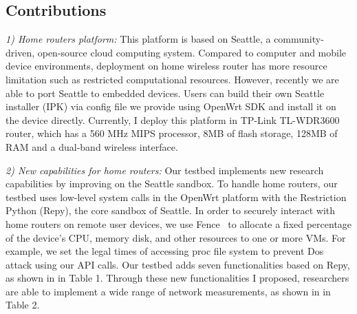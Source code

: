 \documentclass[conference]{IEEEtran}   	%
\begin{document}
\subsection{Contributions}
\textit{1) Home routers platform:} This platform is based on Seattle\cite{zhuang2013experience}, a community-driven, open-source cloud computing system. Compared to computer and mobile device environments, deployment on home wireless router has more resource limitation such as restricted computational resources. However, recently we are able to port Seattle to embedded devices. Users can build their own Seattle installer (IPK) via config file we provide using OpenWrt SDK and install it on the device directly. Currently, I deploy this platform in TP-Link TL-WDR3600 router, which has a 560 MHz MIPS processor, 8MB of flash storage, 128MB of RAM and a dual-band wireless interface.
\newline

\textit{2) New capabilities for home routers:}  Our testbed implements new research capabilities by improving on the Seattle sandbox. To handle home routers, our testbed uses low-level system calls in the OpenWrt platform\cite{openwrt} with the Restriction Python (Repy)\cite{cappos2010retaining}, the core sandbox of Seattle. In order to securely interact with home routers on remote user devices, we use Fence~\cite{li2015fence} to allocate a fixed percentage of the device's CPU, memory disk, and other resources to one or more VMs. For example, we set the legal times of accessing proc file system to prevent Dos attack using our API calls. Our testbed adds seven functionalities based on Repy, as shown in in Table 1. Through these new functionalities I proposed, researchers are able to implement a wide range of network measurements, as shown in in Table 2.
\newline
\end{document}
